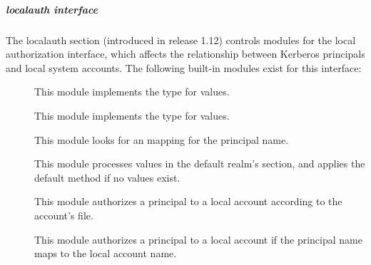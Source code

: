\documentclass[letterpaper,10pt,english]{sphinxmanual}
\begin{document}
\subparagraph{localauth interface}
\label{\detokenize{admin/conf_files/krb5_conf:localauth-interface}}\label{\detokenize{admin/conf_files/krb5_conf:localauth}}
The localauth section (introduced in release 1.12) controls modules
for the local authorization interface, which affects the relationship
between Kerberos principals and local system accounts.  The following
built-in modules exist for this interface:
\begin{description}
\item[{}] \leavevmode
This module implements the  type for 
values.

\item[{}] \leavevmode
This module implements the  type for 
values.

\item[{}] \leavevmode
This module looks for an  mapping for the
principal name.

\item[{}] \leavevmode
This module processes  values in the default
realm’s section, and applies the default method if no
 values exist.

\item[{}] \leavevmode
This module authorizes a principal to a local account according to
the account’s  file.

\item[{}] \leavevmode
This module authorizes a principal to a local account if the
principal name maps to the local account name.

\end{description}
\end{document}
